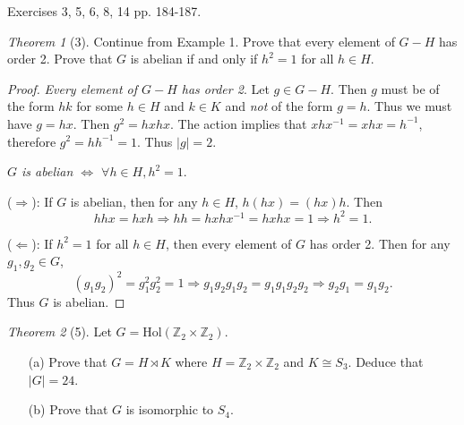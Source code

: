 \documentclass[12pt]{article}
\theoremstyle{remark}
\theoremstyle{named}
\newtheorem*{theorem}{Theorem}
\renewcommand{\implies}{\Rightarrow}
\newcommand{\coimplies}{\Leftarrow}
\begin{document}
Exercises 3, 5, 6, 8, 14 pp. 184-187.

\begin{theorem}[3]
    Continue from Example 1. Prove that every element of \(G - H\) has order 2. Prove that \(G\) is abelian if and only if \(h^2 = 1\) for all \(h \in H\). 
\end{theorem}

\begin{proof}
    \textit{Every element of \(G - H\) has order 2}. Let \(g \in G - H\). Then \(g\) must be of the form \(hk\) for some \(h \in H\) and \(k \in K\) and \textit{not} of the form \(g = h\). Thus we must have \(g = hx\). Then \(g^2 = hxhx\). The action implies that \(xhx^{-1} = xhx = h^{-1}\), therefore \(g^2 = hh^{-1} = 1\). Thus \(|g| = 2\).
    
    \textit{\(G\) is abelian \(\iff\) \(\forall h \in H, h^2 = 1\)}. 
    
    (\(\implies\)): If \(G\) is abelian, then for any \(h \in H\), \(h(hx) = (hx)h\). Then 
    \[hhx = hxh \implies hh = hxhx^{-1} = hxhx = 1 \implies h^2 = 1.\]

    (\(\coimplies\)): If \(h^2 = 1\) for all \(h \in H\), then every element of \(G\) has order 2. Then for any \(g_1, g_2 \in G\), 
    \[(g_1g_2)^2 = g_1^2 g_2^2 = 1 \implies g_1 g_2 g_1 g_2 = g_1 g_1 g_2 g_2 \implies g_2 g_1 = g_1 g_2.\]
    Thus \(G\) is abelian.
\end{proof}

\begin{theorem}[5]
    Let \(G = \text{Hol}(\mathbb Z_2 \times \mathbb Z_2)\).
    \begin{enumerate}
        \item[(a)] Prove that \(G = H \rtimes K\) where \(H = \mathbb Z_2 \times \mathbb Z_2\) and \(K \cong S_3\). Deduce that \(|G| = 24\).
        \item[(b)] Prove that \(G\) is isomorphic to \(S_4\).  
    \end{enumerate}
\end{theorem}
\end{document}
